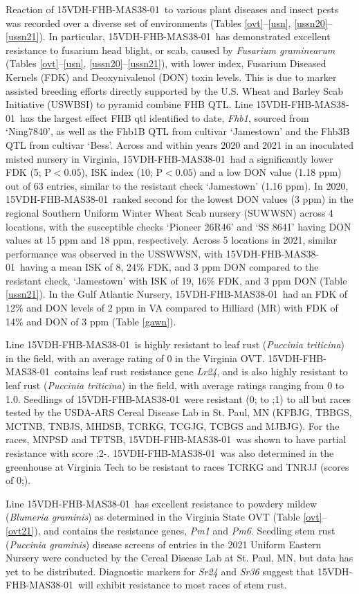 \documentclass[12pt, letterpaper]{article}
\newcommand{\lin}{15VDH-FHB-MAS38-01~}
\begin{document}
Reaction of \lin to various plant diseases and insect pests was recorded over a diverse set of environments (Tables \ref{ovt}--\ref{usn}, \ref{ussn20}--\ref{ussn21}). In particular, \lin has demonstrated excellent resistance to fusarium head blight, or scab, caused by \textit{Fusarium graminearum} (Tables \ref{ovt}--\ref{usn}, \ref{ussn20}--\ref{ussn21}), with lower index, Fusarium Diseased Kernels (FDK) and Deoxynivalenol (DON) toxin levels. This is due to marker assisted breeding efforts directly supported by the U.S. Wheat and Barley Scab Initiative (USWBSI) to pyramid combine FHB QTL. Line \lin has the largest effect FHB qtl identified to date, \textit{Fhb1}, sourced from `Ning7840', as well as the Fhb1B QTL from cultivar `Jamestown' and the Fhb3B QTL from cultivar `Bess'. Across and within years 2020 and 2021 in an inoculated misted nursery in Virginia, \lin had a significantly lower FDK (5; P$<0.05$), ISK index (10; P$<0.05$) and a low DON value (1.18 ppm) out of 63 entries, similar to the resistant check `Jamestown' (1.16 ppm). In 2020, \lin ranked second for the lowest DON values (3 ppm) in the regional Southern Uniform Winter Wheat Scab nursery (SUWWSN) across 4 locations, with the susceptible checks `Pioneer 26R46' and `SS 8641' having DON values at 15 ppm and 18 ppm, respectively. Across 5 locations in 2021, similar performance was observed in the USSWWSN, with \lin having a mean ISK of 8, 24\% FDK, and 3 ppm DON compared to the resistant check, `Jamestown' with ISK of 19, 16\% FDK, and 3 ppm DON (Table \ref{ussn21}). In the Gulf Atlantic Nursery, \lin had an FDK of 12\% and DON levels of 2 ppm in VA compared to Hilliard (MR) with FDK of 14\% and DON of 3 ppm (Table \ref{gawn}). 

Line \lin is highly resistant to leaf rust (\textit{Puccinia triticina}) in the field, with an average rating of 0 in the Virginia OVT. \lin contains leaf rust resistance gene  \textit{Lr24}, and is also highly resistant to leaf rust (\textit{Puccinia triticina}) in the field, with average ratings ranging from 0 to 1.0. Seedlings of \lin were resistant (0; to ;1) to all but races tested by the USDA-ARS Cereal Disease Lab in St. Paul, MN (KFBJG, TBBGS, MCTNB, TNBJS, MHDSB, TCRKG, TCGJG, TCBGS and MJBJG). For the races, MNPSD and TFTSB, \lin was shown to have partial resistance with score ;2-. \lin was also determined in the greenhouse at Virginia Tech to be resistant to races TCRKG and TNRJJ (scores of 0;). 

Line \lin  has excellent resistance to powdery mildew (\textit{Blumeria graminis}) as determined in the Virginia State OVT (Table \ref{ovt}--\ref{ovt21}), and contains the resistance genes, \textit{Pm1} and \textit{Pm6}. Seedling stem rust (\textit{Puccinia graminis}) disease screens of entries in the 2021 Uniform Eastern Nursery were conducted by the Cereal Disease Lab at St. Paul, MN, but data has yet to be distributed. Diagnostic markers for \textit{Sr24} and \textit{Sr36} suggest that \lin will exhibit resistance to most races of stem rust. 
\end{document}
